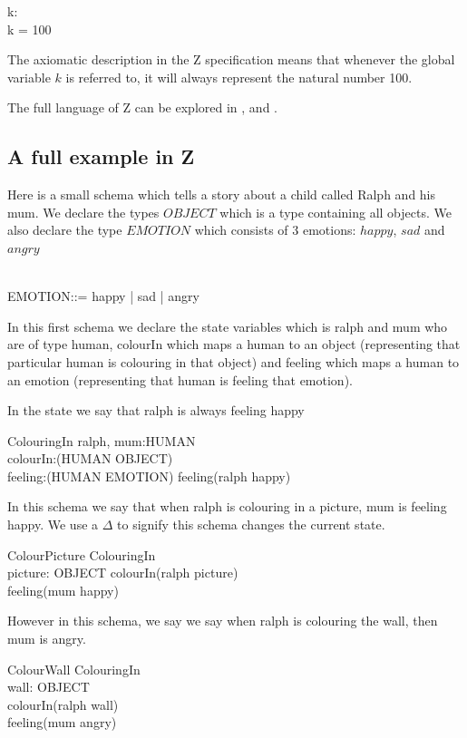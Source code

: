 \begin{axdef}
k: \nat \\
\where
k = 100
\end{axdef}

The axiomatic description in the Z specification means that
whenever the global variable $k$ is referred to, it will always represent the
natural number 100.

The full language of Z can be explored in \cite{spiveyreferencemanual},
\cite{essenceofz} and \cite{Woodcock:1996:UZS:235337}.

\subsection{A full example in Z}
Here is a small schema which tells a story about a child called Ralph and his
mum. We declare the types $OBJECT$ which is a type containing all objects. We
also declare the type $EMOTION$ which consists of 3 emotions: $happy$, $sad$ and
$angry$

\begin{zed}
[OBJECT] \\
EMOTION::= happy | sad | angry
\end{zed}

In this first schema we declare the state variables which is ralph and mum who
are of type human, colourIn which maps a human to an object (representing that
particular human is colouring in that object) and feeling which maps a human to
an emotion (representing that human is feeling that emotion).

In the state we say that ralph is always feeling happy
\begin{schema}{ColouringIn}
ralph, mum:HUMAN \\
colourIn:(HUMAN \pfun OBJECT) \\
feeling:(HUMAN \pfun EMOTION)
\where
feeling(ralph \mapsto happy)
\end{schema}

In this schema we say that when ralph is colouring in a picture, mum is feeling
happy. We use a $\Delta$ to signify this schema changes the current state.
\begin{schema}{ColourPicture}
\Delta ColouringIn \\
picture: OBJECT 
\where
colourIn(ralph \mapsto picture) \\
feeling(mum \mapsto happy)
\end{schema}

However in this schema, we say we say when ralph is colouring the wall, then mum
is angry.
\begin{schema}{ColourWall}
\Delta ColouringIn \\
wall: OBJECT \\
\where
colourIn(ralph \mapsto wall) \\
feeling(mum \mapsto angry)
\end{schema}

